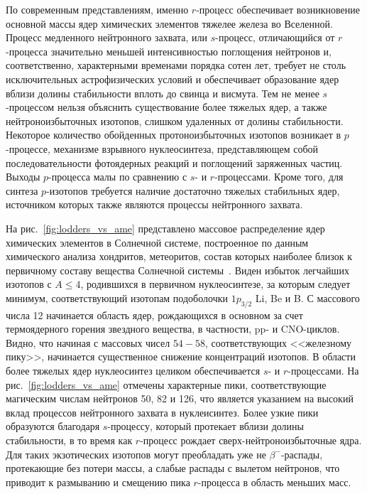По современным представлениям, именно $r$-процесс обеспечивает возникновение основной массы ядер химических элементов тяжелее железа во Вселенной. Процесс медленного нейтронного захвата, или $s$-процесс, отличающийся от $r$-процесса значительно меньшей интенсивностью поглощения нейтронов и, соответственно, характерными временами порядка сотен лет, требует не столь исключительных астрофизических условий и обеспечивает образование ядер вблизи долины стабильности вплоть до свинца и висмута. Тем не менее $s$-процессом нельзя объяснить существование более тяжелых ядер, а также нейтроноизбыточных изотопов, слишком удаленных от долины стабильности. Некоторое количество обойденных протоноизбыточных изотопов возникает в $p$-процессе, механизме взрывного нуклеосинтеза, представляющем собой последовательности фотоядерных реакций и поглощений заряженных частиц. Выходы $p$-процесса малы по сравнению с $s$- и $r$-процессами. Кроме того, для синтеза $p$-изотопов требуется наличие достаточно тяжелых стабильных ядер, источником которых также являются процессы нейтронного захвата. 

На рис.~\ref{fig:lodders_vs_ame} представлено массовое распределение ядер химических элементов в Солнечной системе, построенное по данным химического анализа хондритов, метеоритов, состав которых наиболее близок к первичному составу вещества Солнечной системы~\cite{lodders2003}. Виден избыток легчайших изотопов с $A \leq 4$, родившихся в первичном нуклеосинтезе, за которым следует минимум, соответствующий изотопам подоболочки $1p_{3/2}$ Li, Be и B. С массового числа 12 начинается область ядер, рождающихся в основном за счет термоядерного горения звездного вещества, в частности, pp- и CNO-циклов. Видно, что начиная с массовых чисел $54 - 58$, соответствующих <<железному пику>>, начинается существенное снижение концентраций изотопов. В области более тяжелых ядер нуклеосинтез целиком обеспечивается $s$- и $r$-процессами. На рис.~\ref{fig:lodders_vs_ame} отмечены характерные пики, соответствующие магическим числам нейтронов 50, 82 и 126, что является указанием на высокий вклад процессов нейтронного захвата в нуклеисинтез. Более узкие пики образуются благодаря $s$-процессу, который протекает вблизи долины стабильности, в то время как $r$-процесс рождает сверх-нейтроноизбыточные ядра. Для таких экзотических изотопов могут преобладать уже не $\beta^-$-распады, протекающие без потери массы, а слабые распады с вылетом нейтронов, что приводит к размыванию и смещению пика $r$-процесса в область меньших масс.


